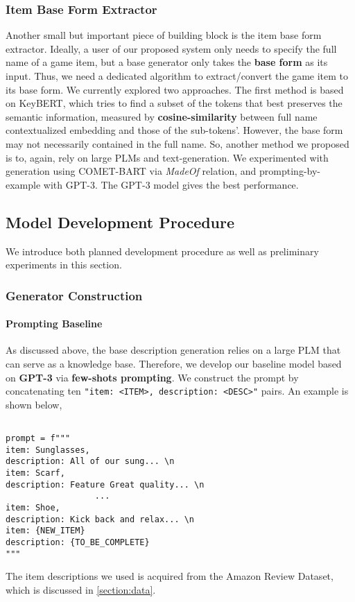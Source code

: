 \documentclass[11pt]{article}
\begin{document}
  \subsubsection{Item Base Form Extractor}
    Another small but important piece of building block is the item base form extractor. 
      Ideally, a user of our proposed system only needs to specify the full name of a game 
      item, but a base generator only takes the \textbf{base form} as its input. Thus, we 
      need a dedicated algorithm to extract/convert the game item to its base form. We 
      currently explored two approaches. The first method is based on KeyBERT, which 
      tries to find a subset of the tokens that best preserves the semantic information, measured 
      by \textbf{cosine-similarity} between full name contextualized embedding and those of the sub-tokens'. However, the base form may not necessarily contained in the full name. So, another
      method we proposed is to, again, rely on large PLMs and text-generation. We experimented 
      with generation using COMET-BART via \textit{MadeOf} relation, and prompting-by-example with 
      GPT-3. The GPT-3 model gives the best performance.
      
\subsection{Model Development Procedure}
    We introduce both planned development procedure as well as 
      preliminary experiments in this section.

    \subsubsection{Generator Construction}
      \paragraph{Prompting Baseline} As discussed above, the base description generation relies on a 
        large PLM that can serve as a knowledge base. Therefore, we develop our baseline model based 
        on \textbf{GPT-3} via \textbf{few-shots prompting}. We construct the prompt by concatenating 
        ten \lstinline{"item: <ITEM>, description: <DESC>"} pairs. An example is shown below,
        \begin{lstlisting}

prompt = f"""
item: Sunglasses, 
description: All of our sung... \n
item: Scarf,
description: Feature Great quality... \n
                  ...
item: Shoe, 
description: Kick back and relax... \n
item: {NEW_ITEM}
description: {TO_BE_COMPLETE}
"""
        \end{lstlisting}
        The item descriptions we used is acquired from the Amazon Review Dataset, which is discussed 
          in \cref{section:data}.
      
\end{document}
